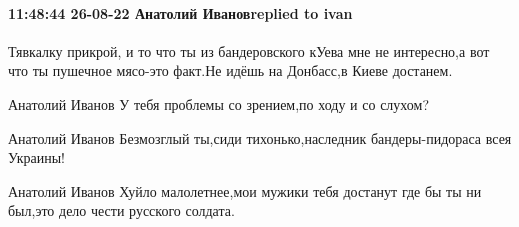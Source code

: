 
 
 
 
 

\paragraph{11:48:44 26-08-22 Анатолий Ивановreplied to ivan}

Тявкалку прикрой, и то что ты из бандеровского кУева мне не интересно,а вот что
ты пушечное мясо-это факт.Не идёшь на Донбасс,в Киеве достанем.

Анатолий Иванов
У тебя проблемы со зрением,по ходу и со слухом?

Анатолий Иванов
Безмозглый ты,сиди тихонько,наследник бандеры-пидораса всея Украины!

Анатолий Иванов
Хуйло малолетнее,мои мужики тебя достанут где бы ты ни был,это дело чести русского солдата.
